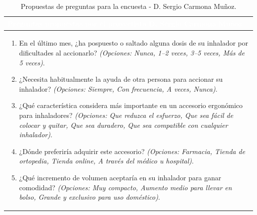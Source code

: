 \documentclass[11pt,a4paper]{article}
\begin{document}
\begin{table}[H]
    \centering
    \small
    \renewcommand{\arraystretch}{1.5}
    \begin{tabularx}{\linewidth}{|X|}
        \hline
        \rowcolor{ArthroNavy}
        \textcolor{white}{\textbf{Preguntas propuestas por el proyectista D. Sergio Carmona Muñoz}} \\ \hline
        \vspace{0.1cm}
        \begin{enumerate}[leftmargin=0.8cm, itemsep=0.2cm]
            \item En el último mes, ¿ha pospuesto o saltado alguna dosis de su inhalador por dificultades al accionarlo? \textit{(Opciones: Nunca, 1--2 veces, 3--5 veces, Más de 5 veces)}.
            \item ¿Necesita habitualmente la ayuda de otra persona para accionar su inhalador? \textit{(Opciones: Siempre, Con frecuencia, A veces, Nunca)}.
            \item ¿Qué característica considera más importante en un accesorio ergonómico para inhaladores? \textit{(Opciones: Que reduzca el esfuerzo, Que sea fácil de colocar y quitar, Que sea duradero, Que sea compatible con cualquier inhalador)}.
            \item ¿Dónde preferiría adquirir este accesorio? \textit{(Opciones: Farmacia, Tienda de ortopedia, Tienda online, A través del médico u hospital)}.
            \item ¿Qué incremento de volumen aceptaría en su inhalador para ganar comodidad? \textit{(Opciones: Muy compacto, Aumento medio para llevar en bolso, Grande y exclusivo para uso doméstico)}.
        \end{enumerate}
        \vspace{0.1cm} \\ \hline
    \end{tabularx}
    \caption{Propuestas de preguntas para la encuesta - D. Sergio Carmona Muñoz.}
    \label{tab:encuesta_sergio}
\end{table}

\vspace{0.4cm}
\end{document}
